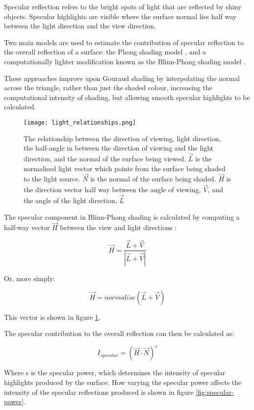 Specular reflection refers to the bright spots of light that are reflected by shiny objects. Specular highlights are visible where the surface normal lies half way between the light direction and the view direction.

Two main models are used to estimate the contribution of specular reflection to the overall reflection of a surface: the Phong shading model \parencite{phong75shading}, and a computationally lighter modification known as the Blinn-Phong shading model \parencite{blinn77blinnphong}.

These approaches improve upon Gouraud shading by interpolating the normal across the triangle, rather than just the shaded colour, increasing the computational intensity of shading, but allowing smooth specular highlights to be calculated.

\begin{figure}
\centering
	\texttt{[image: light\_relationships.png]}
	\caption{The relationship between the direction of viewing, light direction, the half-angle in between the direction of viewing and the light direction, and the normal of the surface being viewed. $\vec{L}$ is the normalised light vector which points from the surface being shaded to the light source. $\vec{N}$ is the normal of the surface being shaded. $\vec{H}$ is the direction vector half way between the angle of viewing, $\vec{V}$, and the angle of the light direction, $\vec{L}$}
	\label{fig:specular-direction-relationships}
\end{figure}

The specular component in Blinn-Phong shading is calculated by computing a half-way vector $\vec{H}$ between the view and light directions \parencite{blinn77blinnphong}:

\[
	\vec{H} = \frac{\vec{L} + \vec{V}}{|\vec{L} + \vec{V}|}
\]

Or, more simply:

\[
	\vec{H} = normalise(\vec{L} + \vec{V})
\]

This vector is shown in figure \ref{fig:specular-direction-relationships}.

The specular contribution to the overall reflection can then be calculated as:

\[
	I_{specular} = (\vec{H} \cdot \vec{N})^s
\]

Where s is the specular power, which determines the intensity of specular highlights produced by the surface. How varying the specular power affects the intensity of the specular reflections produced is shown in figure \ref{fig:specular-power}.

